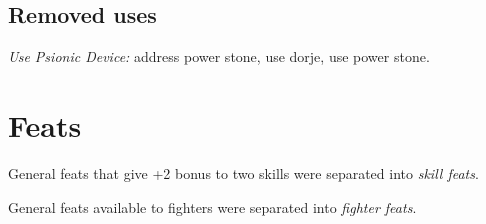 \subsection{Removed uses}
\begin{itemize*}
\item \textit{Use Psionic Device:} address power stone, use dorje, use power stone.
\end{itemize*}

\section{Feats}
\begin{itemize*}
\item General feats that give +2 bonus to two skills were separated into \textit{skill feats}.
\item General feats available to fighters were separated into \textit{fighter feats}.
\end{itemize*}

